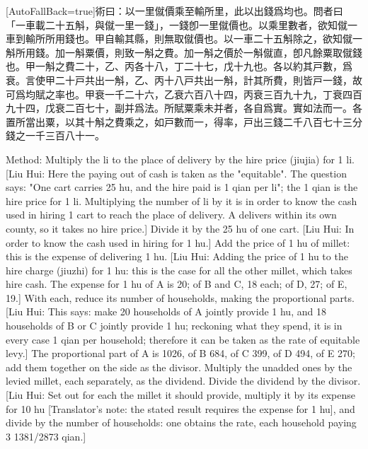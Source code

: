 \documentclass[11pt]{article}
\newcommand{\zhsmall}{\footnotesize\color{black!70}}
\newcommand{\unitlabel}[1]{\marginpar{\raggedleft\tiny\color{gray}#1}}
\newenvironment{unitzh}{\par\CJKfontspec{Noto Serif CJK SC}[AutoFallBack=true]\large\linespread{1.25}\selectfont}{\par}
\newenvironment{uniten}{\par\small\color{black!85}}{\par\medskip}
\begin{document}
\begin{unitzh}\unitlabel{jiuzhang-023.11}術曰：以一里僦價乘至輸所里，{\zhsmall 此以出錢爲均也。問者曰「一車載二十五斛，與僦一里一錢」，一錢卽一里僦價也。以乘里數者，欲知僦一車到輸所所用錢也。甲自輸其縣，則無取僦價也。}以一車二十五斛除之，{\zhsmall 欲知僦一斛所用錢。}加一斛粟價，則致一斛之費。{\zhsmall 加一斛之價於一斛僦直，卽凡餘粟取僦錢也。甲一斛之費二十，乙、丙各十八，丁二十七，戊十九也。}各以約其戸數，爲衰。{\zhsmall 言使甲二十戸共出一斛，乙、丙十八戸共出一斛，計其所費，則皆戸一錢，故可爲均賦之率也。}甲衰一千二十六，乙衰六百八十四，丙衰三百九十九，丁衰四百九十四，戊衰二百七十，副并爲法。所賦粟乘未并者，各自爲實。實如法而一。{\zhsmall 各置所當出粟，以其十斛之費乘之，如戸數而一，得率，戸出三錢二千八百七十三分錢之一千三百八十一。}\end{unitzh}
\begin{uniten}Method: Multiply the li to the place of delivery by the hire price (jiujia) for 1 li. [Liu Hui: Here the paying out of cash is taken as the "equitable". The question says: "One cart carries 25 hu, and the hire paid is 1 qian per li"; the 1 qian is the hire price for 1 li. Multiplying the number of li by it is in order to know the cash used in hiring 1 cart to reach the place of delivery. A delivers within its own county, so it takes no hire price.] Divide it by the 25 hu of one cart. [Liu Hui: In order to know the cash used in hiring for 1 hu.] Add the price of 1 hu of millet: this is the expense of delivering 1 hu. [Liu Hui: Adding the price of 1 hu to the hire charge (jiuzhi) for 1 hu: this is the case for all the other millet, which takes hire cash. The expense for 1 hu of A is 20; of B and C, 18 each; of D, 27; of E, 19.] With each, reduce its number of households, making the proportional parts. [Liu Hui: This says: make 20 households of A jointly provide 1 hu, and 18 households of B or C jointly provide 1 hu; reckoning what they spend, it is in every case 1 qian per household; therefore it can be taken as the rate of equitable levy.] The proportional part of A is 1026, of B 684, of C 399, of D 494, of E 270; add them together on the side as the divisor. Multiply the unadded ones by the levied millet, each separately, as the dividend. Divide the dividend by the divisor. [Liu Hui: Set out for each the millet it should provide, multiply it by its expense for 10 hu [Translator's note: the stated result requires the expense for 1 hu], and divide by the number of households: one obtains the rate, each household paying 3 1381/2873 qian.]\end{uniten}
\end{document}
